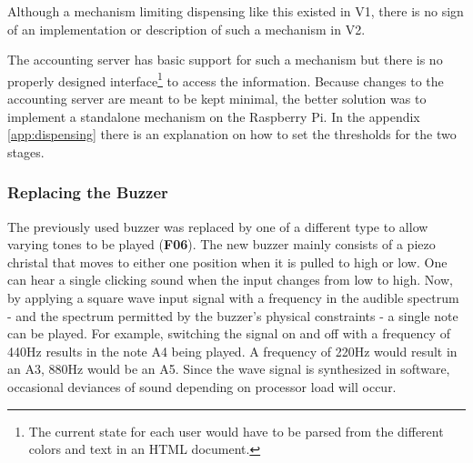 \documentclass[12pt]{article}
\begin{document}
Although a mechanism limiting dispensing like this existed in V1,
there is no sign of an implementation or description of such a mechanism in V2.

The accounting server has basic support for such a mechanism but there is no properly designed interface\footnote{The current state for each user would have to be parsed from the different colors and text in an HTML document.} to access the information.
Because changes to the accounting server are meant to be kept minimal, the better solution was to implement a standalone mechanism on the Raspberry Pi.
In the appendix \ref{app:dispensing} there is an explanation on how to set the thresholds for the two stages.

\subsubsection{Replacing the Buzzer}
The previously used buzzer was replaced by one of a different type to allow varying tones to be played (\textbf{F06}).
The new buzzer mainly consists of a piezo christal that moves to either one position when it is pulled to high or low.
One can hear a single clicking sound when the input changes from low to high.
Now, by applying a square wave input signal with a frequency in the audible spectrum - and the spectrum permitted by the buzzer's physical constraints - a single note can be played.
For example, switching the signal on and off with a frequency of 440Hz results in the note A4 being played.
A frequency of 220Hz would result in an A3, 880Hz would be an A5.
Since the wave signal is synthesized in software, occasional deviances of sound depending on processor load will occur.
\end{document}
